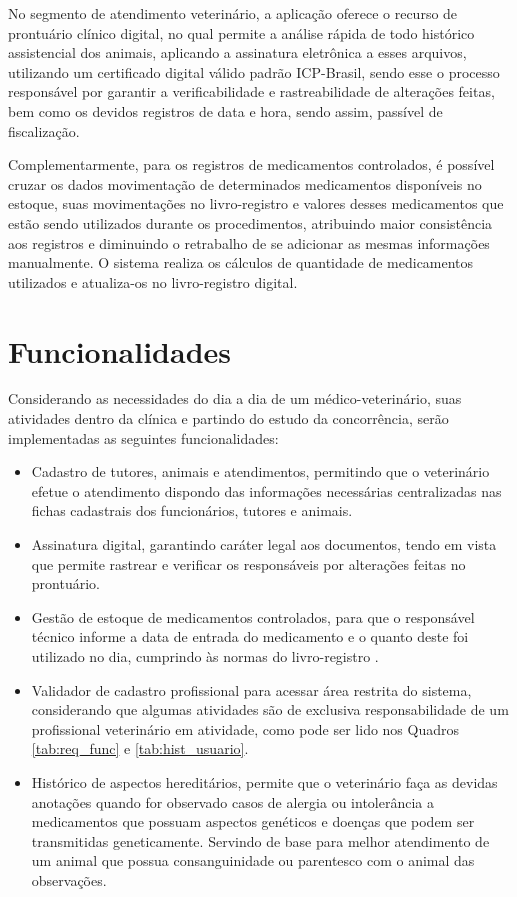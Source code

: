 \documentclass[
    12pt,               %
    openright,          %
    oneside,
    a4paper,            %
    BIBLATEX,           %
    TODO,               %
    english,            %
    brazil              %
    ]{ifsp-spo-inf-ctds}
\begin{document}
        No segmento de atendimento veterinário, a aplicação oferece o recurso de prontuário clínico digital, no qual permite a análise rápida de todo histórico assistencial dos animais, aplicando a assinatura eletrônica a esses arquivos, utilizando um certificado digital válido padrão ICP-Brasil, sendo esse o processo responsável por garantir a verificabilidade e rastreabilidade de alterações feitas, bem como os devidos registros de data e hora, sendo assim, passível de fiscalização.
        
        Complementarmente, para os registros de medicamentos controlados, é possível cruzar os dados movimentação de determinados medicamentos disponíveis no estoque, suas movimentações no livro-registro e valores desses medicamentos que estão sendo utilizados durante os procedimentos, atribuindo maior consistência aos registros e diminuindo o retrabalho de se adicionar as mesmas informações manualmente. O sistema realiza os cálculos de quantidade de medicamentos utilizados e atualiza-os no livro-registro digital.

    \section{Funcionalidades}
    
        Considerando as necessidades do dia a dia de um médico-veterinário, suas atividades dentro da clínica e partindo do estudo da concorrência, serão implementadas as seguintes funcionalidades:

        \begin{itemize}
            \item Cadastro de tutores, animais e atendimentos, permitindo que o veterinário efetue o atendimento dispondo das informações necessárias centralizadas nas fichas cadastrais dos funcionários, tutores e animais.
            \item Assinatura digital, garantindo caráter legal aos documentos, tendo em vista que permite rastrear e verificar os responsáveis por alterações feitas no prontuário. 
            \item Gestão de estoque de medicamentos controlados, para que o responsável técnico informe a data de entrada do medicamento e o quanto deste foi utilizado no dia, cumprindo às normas do livro-registro .
            \item Validador de cadastro profissional para acessar área restrita do sistema, considerando que algumas atividades são de exclusiva responsabilidade de um profissional veterinário em atividade, como pode ser lido nos Quadros \ref{tab:req_func} e \ref{tab:hist_usuario}.
            \item Histórico de aspectos hereditários, permite que o veterinário faça as devidas anotações quando for observado casos de alergia ou intolerância a medicamentos que possuam aspectos genéticos e doenças que podem ser transmitidas geneticamente. Servindo de base para melhor atendimento de um animal que possua consanguinidade ou parentesco com o animal das observações.
        \end{itemize}
\end{document}
